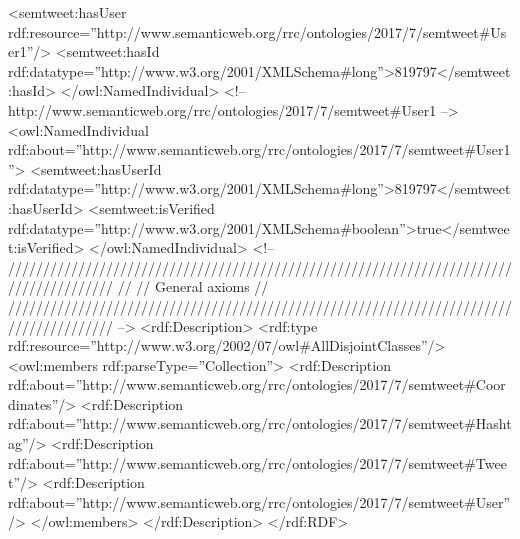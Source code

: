 \begin{listing}[
  language = XML,
  numbers=left,
  numberstyle=\tiny,
  stepnumber=5,
  numbersep=5pt,
  frame=single,
  caption  = {Ontología de tweets: Ontotwitter},
  label    = code:ontotwitter]
        <semtweet:hasUser
        rdf:resource=''http://www.semanticweb.org/rrc/ontologies/2017/7/semtweet#User1''/>
        <semtweet:hasId
        rdf:datatype=''http://www.w3.org/2001/XMLSchema#long''>819797</semtweet:hasId>
    </owl:NamedIndividual>
    <!-- http://www.semanticweb.org/rrc/ontologies/2017/7/semtweet#User1 -->
    <owl:NamedIndividual
    rdf:about=''http://www.semanticweb.org/rrc/ontologies/2017/7/semtweet#User1''>
        <semtweet:hasUserId
        rdf:datatype=''http://www.w3.org/2001/XMLSchema#long''>819797</semtweet:hasUserId>
        <semtweet:isVerified
        rdf:datatype=''http://www.w3.org/2001/XMLSchema#boolean''>true</semtweet:isVerified>
    </owl:NamedIndividual>
    <!-- 
    ///////////////////////////////////////////////////////////////////////////////////////
    //
    // General axioms
    //
    ///////////////////////////////////////////////////////////////////////////////////////
     -->
    <rdf:Description>
        <rdf:type
        rdf:resource=''http://www.w3.org/2002/07/owl#AllDisjointClasses''/>
        <owl:members rdf:parseType=''Collection''>
            <rdf:Description
            rdf:about=''http://www.semanticweb.org/rrc/ontologies/2017/7/semtweet#Coordinates''/>
            <rdf:Description
            rdf:about=''http://www.semanticweb.org/rrc/ontologies/2017/7/semtweet#Hashtag''/>
            <rdf:Description
            rdf:about=''http://www.semanticweb.org/rrc/ontologies/2017/7/semtweet#Tweet''/>
            <rdf:Description
            rdf:about=''http://www.semanticweb.org/rrc/ontologies/2017/7/semtweet#User''/>
        </owl:members>
    </rdf:Description>
</rdf:RDF>

\end{listing}
